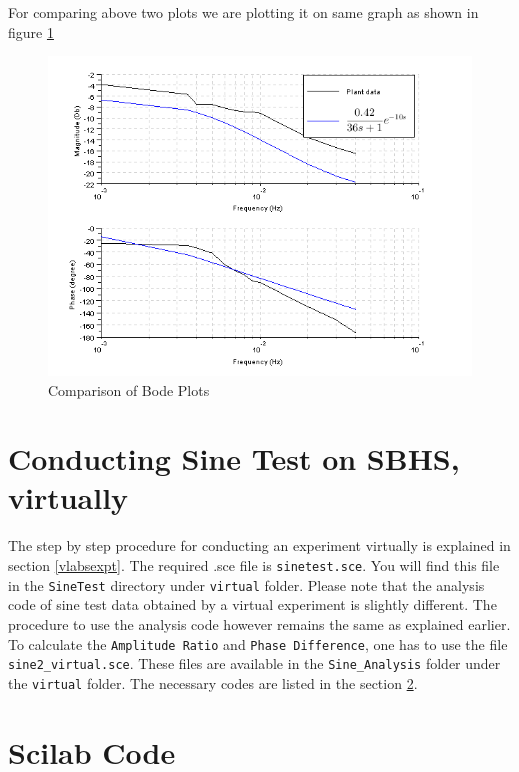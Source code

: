 For comparing above two plots we are plotting it on same graph as shown in figure \ref{compare_bode}
\begin{figure}
\centering
\includegraphics[width=\linewidth]{sinetest_manual/bode_comparison}
\caption{Comparison of Bode Plots}
\label{compare_bode}
\end{figure}


\section{Conducting Sine Test on SBHS, virtually}
The step by step procedure for conducting an experiment virtually is explained in section \ref{vlabsexpt}. The required .sce file is {\tt sinetest.sce}.  You will find this file in the {\tt SineTest} directory under {\tt virtual} folder. Please note that the analysis code of sine test data obtained by a virtual experiment is slightly different. The procedure to use the analysis code however remains the same as explained earlier. To calculate the {\tt Amplitude Ratio} and {\tt Phase Difference}, one has to use the file {\tt sine2\_virtual.sce}. These files are available in the {\tt Sine\_Analysis} folder under the {\tt virtual} folder. The necessary codes are listed in the section \ref{sinecodes}.


\section{Scilab Code}\label{sinecodes}

\begin{code}

\end{code}



